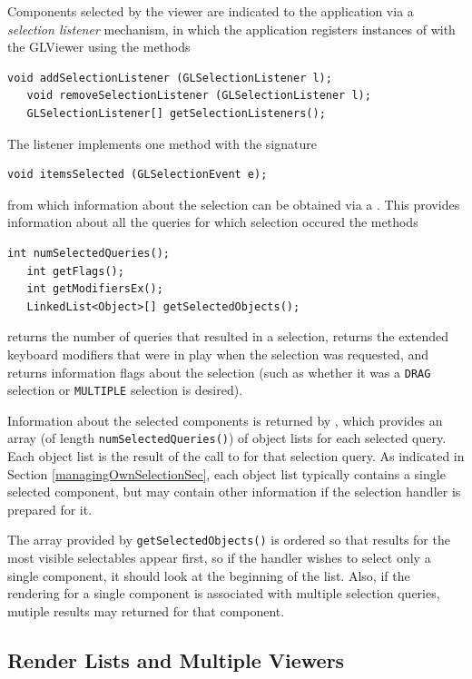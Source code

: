 \documentclass{article}
\begin{document}
Components selected by the viewer are indicated to the application via a
{\it selection listener} mechanism, in which the application registers
instances of  with the GLViewer
using the methods
\begin{lstlisting}[]
   void addSelectionListener (GLSelectionListener l);
   void removeSelectionListener (GLSelectionListener l);
   GLSelectionListener[] getSelectionListeners();
\end{lstlisting}
The listener implements one method with the signature
\begin{lstlisting}[]
   void itemsSelected (GLSelectionEvent e);
\end{lstlisting}
from which information about the selection can be obtained via a
. This provides information about all the
queries for which selection occured the methods
\begin{lstlisting}[]
   int numSelectedQueries();
   int getFlags();
   int getModifiersEx();
   LinkedList<Object>[] getSelectedObjects();
\end{lstlisting}
 returns the number
of queries that resulted in a selection,
 returns the extended
keyboard modifiers that were in play when the selection was requested,
and  returns information
flags about the selection (such as whether it was a {\tt DRAG}
selection or {\tt MULTIPLE} selection is desired).

Information about the selected components is returned by
, which provides an
array (of length {\tt numSelectedQueries()}) of object lists for
each selected query. Each object list is the result of the call to
 for that selection query. As
indicated in Section \ref{managingOwnSelectionSec}, each object list
typically contains a single selected component, but may contain other
information if the selection handler is prepared for it.

The array provided by {\tt getSelectedObjects()} is ordered so that
results for the most visible selectables appear first, so if the
handler wishes to select only a single component, it should look at
the beginning of the list. Also, if the rendering for a single
component is associated with multiple selection queries, mutiple
results may returned for that component.

\subsection{Render Lists and Multiple Viewers}
\end{document}
